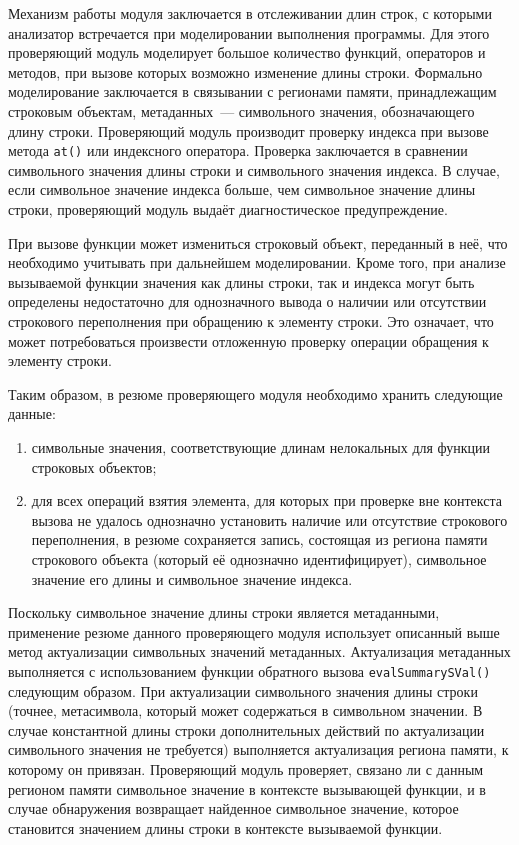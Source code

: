 Механизм работы модуля заключается в отслеживании длин строк, с которыми анализатор встречается при моделировании выполнения программы. Для этого проверяющий модуль моделирует большое количество функций, операторов и методов, при вызове которых возможно изменение длины строки. Формально моделирование заключается в связывании с регионами памяти, принадлежащим строковым объектам, метаданных~--- символьного значения, обозначающего длину строки. Проверяющий модуль производит проверку индекса при вызове метода \texttt{at()} или индексного оператора. Проверка заключается в сравнении символьного значения длины строки и символьного значения индекса. В случае, если символьное значение индекса больше, чем символьное значение длины строки, проверяющий модуль выдаёт диагностическое предупреждение.

При вызове функции может измениться строковый объект, переданный в неё, что необходимо учитывать при дальнейшем моделировании. Кроме того, при анализе вызываемой функции значения как длины строки, так и индекса могут быть определены недостаточно для однозначного вывода о наличии или отсутствии строкового переполнения при обращению к элементу строки. Это означает, что может потребоваться произвести отложенную проверку операции обращения к элементу строки.

Таким образом, в резюме проверяющего модуля необходимо хранить следующие данные:

\begin{enumerate}
 \item символьные значения, соответствующие длинам нелокальных для функции строковых объектов;
 \item для всех операций взятия элемента, для которых при проверке вне контекста вызова не удалось однозначно установить наличие или отсутствие строкового переполнения, в резюме сохраняется запись, состоящая из региона памяти строкового объекта (который её однозначно идентифицирует), символьное значение его длины и символьное значение индекса.
\end{enumerate}

Поскольку символьное значение длины строки является метаданными, применение резюме данного проверяющего модуля использует описанный выше метод актуализации символьных значений метаданных. Актуализация метаданных выполняется с использованием функции обратного вызова \texttt{evalSummarySVal()} следующим образом. При актуализации символьного значения длины строки (точнее, метасимвола, который может содержаться в символьном значении. В случае константной длины строки дополнительных действий по актуализации символьного значения не требуется) выполняется актуализация региона памяти, к которому он привязан. Проверяющий модуль проверяет, связано ли с данным регионом памяти символьное значение в контексте вызывающей функции, и в случае обнаружения возвращает найденное символьное значение, которое становится значением длины строки в контексте вызываемой функции.


